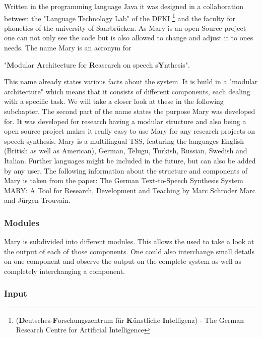 \documentclass[a4paper, 12pt]{article}
\begin{document}
Written in the programming language Java it was designed in a collaboration between the  "Language Technology Lab" of the DFKI \footnote {(\textbf{D}eutsches-\textbf{F}orschungszentrum für \textbf{K}ünstliche \textbf{I}ntelligenz) - The German Research Centre for Artificial Intelligence} and the faculty for phonetics of the university of Saarbrücken.
As Mary is an open Source project one can not only see the code but is also allowed to change and adjust it to ones needs.\newline \newline
The name Mary is an acronym for \newline 
\begin{center}"\textbf{M}odular \textbf{A}rchitecture for \textbf{R}easearch on speech s\textbf{Y}nthesis".\end{center}
This name already states various facts about the system. 
It is build in a "modular architecture" which means that it consists of different components, each dealing with a specific task. We will take a closer look at these in the following subchapter.
The second part of the name states the purpose Mary was developed for.
It was developed for research having a modular structure and also being a open source project makes it really easy to use Mary for any research projects on speech synthesis. \newline \newline
Mary is a multilingual TSS, featuring the languages English (British as well as American), German, Telugu, Turkish, Russian, Swedish and Italian. 
Further languages might be included in the future, but can also be added by any user. \newline \newline
The following information about the structure and components of Mary is taken from the paper: 
The German Text-to-Speech Synthesis System MARY:
A Tool for Research, Development and Teaching by Marc Schröder Marc and Jürgen Trouvain.

\subsubsection {Modules}

Mary is subdivided into different modules. 
This allows the used to take a look at the output of each of those components. 
One could also interchange small details on one component and observe the output on the complete system as well as completely interchanging a component.

\subsubsection* {Input}
\end{document}
